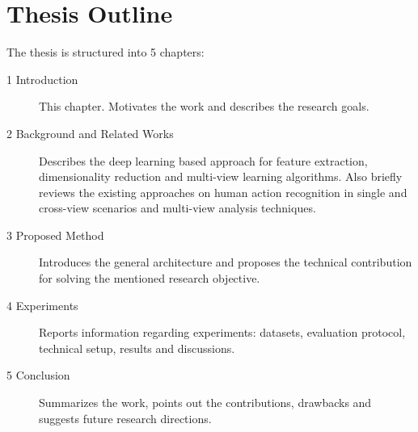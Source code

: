     \section{Thesis Outline} \label{sec:intro_outline}
        The thesis is structured into 5 chapters:
        \begin{description}
            \item[1 Introduction] This chapter. Motivates the work and describes the research goals.
            \item[2 Background and Related Works] Describes the deep learning based approach for feature extraction, dimensionality reduction and multi-view learning algorithms. Also briefly reviews the existing approaches on human action recognition in single and cross-view scenarios and multi-view analysis techniques.
            \item[3 Proposed Method] Introduces the general architecture and proposes the technical contribution for solving the mentioned research objective.
            \item[4 Experiments] Reports information regarding experiments: datasets, evaluation protocol, technical setup, results and discussions.
            \item[5 Conclusion] Summarizes the work, points out the contributions, drawbacks and suggests future research directions.
        \end{description}
